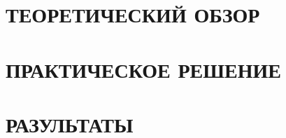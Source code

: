 \documentclass[a4paper,12pt]{extarticle} %
\begin{document}
    
    \pagebreak

    
    \pagebreak

    \tableofcontents{}
    \pagebreak

    \label{sec:introduction}
    

    \newpage
    \section{ТЕОРЕТИЧЕСКИЙ ОБЗОР}
    \label{sec:theory}
    

    \newpage
    \section{ПРАКТИЧЕСКОЕ РЕШЕНИЕ}
    \label{sec:practice}
    

    \newpage
    \section{РАЗУЛЬТАТЫ}
    \label{sec:results}
    

    \newpage
    \label{sec:conclusion}
    

    \newrefcontext[sorting=ntvy]
    \printbibliography[env=gostbibliography, title=Источники литературы]
\end{document}
